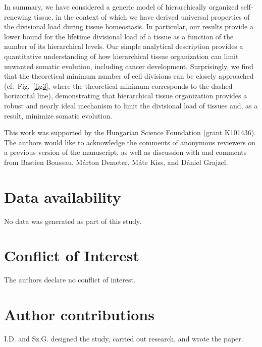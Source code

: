 \documentclass[aps,singlecolumn]{revtex4-1}
\begin{document}
In summary, we have considered a generic model of hierarchically
organized self-renewing tissue, in the context of which we have derived
universal properties of the divisional load during tissue homeostasis.
In particular, our results provide a lower bound for the
lifetime divisional load of a tissue as a function of the number of its
hierarchical levels.
Our simple analytical description provides a
quantitative understanding of how hierarchical tissue organization can
limit unwanted somatic evolution, including cancer development.
Surprisingly, we
find that the theoretical minimum number of cell divisions can be
closely approached (cf.\ Fig.~\ref{fig3}, where the theoretical minimum
corresponds to the dashed horizontal line), demonstrating that hierarchical
tissue organization
provides a robust and nearly ideal mechanism to limit the divisional
load of tissues and, as a result, minimize somatic evolution.


\begin{acknowledgments}

%
This work was supported by the Hungarian Science Foundation (grant K101436).
%
%
The authors would like to acknowledge the comments of anonymous
reviewers on a previous version of the manuscript, as well as discussion
with and comments from Bastien Boussau, M\'arton Demeter, M\'ate Kiss, and
D\'aniel Grajzel.
\end{acknowledgments}

\section*{Data availability}
No data was generated as part of this study.

\section*{Conflict of Interest}
The authors declare no conflict of interest.

\section*{Author contributions}

I.D. and Sz.G. designed the study, carried out research, and wrote the paper.

%


%
\end{document}
